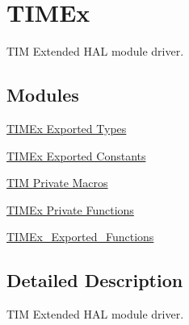 \hypertarget{group___t_i_m_ex}{}\section{T\+I\+M\+Ex}
\label{group___t_i_m_ex}


T\+IM Extended H\+AL module driver.  


\subsection*{Modules}
\begin{DoxyCompactItemize}
\item 
\hyperlink{group___t_i_m_ex___exported___types}{T\+I\+M\+Ex Exported Types}
\item 
\hyperlink{group___t_i_m_ex___exported___constants}{T\+I\+M\+Ex Exported Constants}
\item 
\hyperlink{group___t_i_m___private___macros}{T\+I\+M Private Macros}
\item 
\hyperlink{group___t_i_m_ex___private___functions}{T\+I\+M\+Ex Private Functions}
\item 
\hyperlink{group___t_i_m_ex___exported___functions}{T\+I\+M\+Ex\+\_\+\+Exported\+\_\+\+Functions}
\end{DoxyCompactItemize}


\subsection{Detailed Description}
T\+IM Extended H\+AL module driver. 

